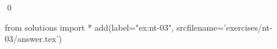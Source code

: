 
\begin{ex} 
  \label{ex:nt-03}
  
  \qed
\end{ex} 
\begin{python0}
from solutions import *
add(label="ex:nt-03",
    srcfilename='exercises/nt-03/answer.tex') 
\end{python0}
